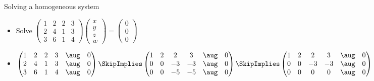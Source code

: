 \documentclass{beamer}
\begin{document}
\begin{frame}{Solving a homogeneous system}
\begin{itemize}
\item Solve
$
\begin{pmatrix}
1 & 2 & 2 & 3 \\
2 & 4 & 1 & 3 \\
3 & 6 & 1 & 4
\end{pmatrix}
\begin{pmatrix}
x \\ y \\ z \\ w
\end{pmatrix}=
\begin{pmatrix}
0 \\ 0 \\ 0
\end{pmatrix}
$
\item
$
\begin{pmatrix}
1 & 2 & 2 & 3 & \aug & 0 \\
2 & 4 & 1 & 3 & \aug & 0  \\
3 & 6 & 1 & 4 & \aug & 0
\end{pmatrix}
\SkipImplies
\begin{pmatrix}
1 & 2 & 2 & 3 & \aug & 0  \\
0 & 0 & -3 & -3  & \aug & 0  \\
0 & 0 & -5 & -5 & \aug & 0
\end{pmatrix}
\SkipImplies
\begin{pmatrix}
1 & 2 & 2 & 3    & \aug & 0  \\
0 & 0 & -3 & -3  & \aug & 0  \\
0 & 0 & 0 & 0    & \aug & 0
\end{pmatrix}
$
\end{itemize}
\end{frame}
\end{document}
